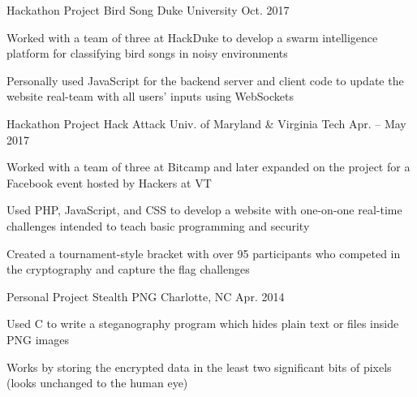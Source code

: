 

\begin{cventries}

  \cventry
    {Hackathon Project} %
    {Bird Song} %
    {Duke University} %
    {Oct. 2017} %
    {
      \begin{cvitems} %
      \item {Worked with a team of three at HackDuke to develop a swarm intelligence platform for classifying bird songs in noisy environments}
      \item {Personally used JavaScript for the backend server and client code to update the website real-team with all users' inputs using WebSockets}
      \end{cvitems}
    }

  \cventry
    {Hackathon Project} %
    {Hack Attack} %
    {Univ. of Maryland \& Virginia Tech} %
    {Apr. – May 2017} %
    {
      \begin{cvitems} %
      \item {Worked with a team of three at Bitcamp and later expanded on the project for a Facebook event hosted by Hackers at VT}
      \item {Used PHP, JavaScript, and CSS to develop a website with one-on-one real-time challenges intended to teach basic programming and security}
      \item {Created a tournament-style bracket with over 95 participants who competed in the cryptography and capture the flag challenges}
      \end{cvitems}
    }

  \cventry
    {Personal Project} %
    {Stealth PNG} %
    {Charlotte, NC} %
    {Apr. 2014} %
    {
      \begin{cvitems} %
      \item {Used C to write a steganography program which hides plain text or files inside PNG images}
      \item {Works by storing the encrypted data in the least two significant bits of pixels (looks unchanged to the human eye)}
      \end{cvitems}
    }

\end{cventries}

